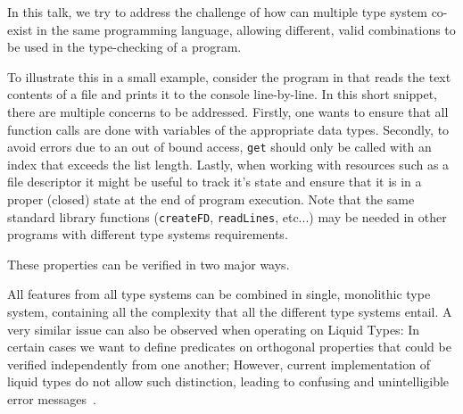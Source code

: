 \documentclass{easychair}
\begin{document}
In this talk, we try to address the challenge of how can multiple type system co-exist in the same programming language, allowing different, valid combinations to be used in the type-checking of a program.
 
 
 To illustrate this in a small example, consider the program in  that reads the text contents of a file and prints it to the console line-by-line. In this short snippet, there are multiple concerns to be addressed. Firstly, one wants to ensure that all function calls are done with variables of the appropriate data types. Secondly, to avoid errors due to an out of bound access, \texttt{get} should only be called with an index that exceeds the list length. Lastly, when working with resources such as a file descriptor it might be useful to track it's state and ensure that it is in a proper (closed) state at the end of program execution. Note that the same standard library functions (\lstinline|createFD|, \lstinline|readLines|, etc...) may be needed in other programs with different type systems requirements.
 


These properties can be verified in two major ways. 

All features from all type systems can be combined in single, monolithic type system, containing all the complexity that all the different type systems entail. A very similar issue can also be observed when operating on Liquid Types: In certain cases we want to define predicates on orthogonal properties that could be verified independently from one another; However, current implementation of liquid types do not allow such distinction, leading to confusing and unintelligible error messages~\cite{wits-error-messages}. 
\end{document}
